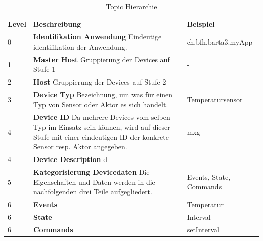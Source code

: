 \begin{table}[h!]
\begin{tabularx}{\textwidth}{|l|X|l|}

 \hline
 {\bf Level } & {\bf Beschreibung } & {\bf Beispiel } \\ 
 \hline
 0  &   \textbf{Identifikation Anwendung} \newline Eindeutige identifikation der Anwendung.  &    
  ch.bfh.barta3.myApp   \\ \hline
 
 1  &   \textbf{Master Host}  \newline Gruppierung der Devices auf Stufe 1  &     -   \\ \hline

 2  &   \textbf{Host} \newline Gruppierung der Devices auf Stufe 2   &   -   \\ \hline

 3  &   \textbf{Device Typ} \newline Bezeichnung, um was für einen Typ von Sensor oder Aktor es sich handelt.  &     Temperatursensor   \\ \hline

 4  &   \textbf{Device ID} \newline Da mehrere Devices vom selben Typ im Einsatz sein können, wird auf dieser Stufe mit einer eindeutigen ID der konkrete Sensor resp. Aktor angegeben.   &    mxg   \\ \hline
 
  4  &   \textbf{Device Description} \newline d   &    -   \\ \hline

 5  &   \textbf{Kategorisierung Devicedaten} \newline  Die Eigenschaften und Daten werden in die nachfolgenden drei Teile aufgegliedert.  &     Events, State, Commands   \\ \hline

 6  &   \textbf{Events} \newline    &     Temperatur   \\ \hline

 6  &   \textbf{State} \newline    &     Interval   \\ \hline
 
 6  &   \textbf{Commands} \newline    &   setInterval   \\ \hline
 
\end{tabularx}
\caption{Topic Hierarchie}
\end{table}

